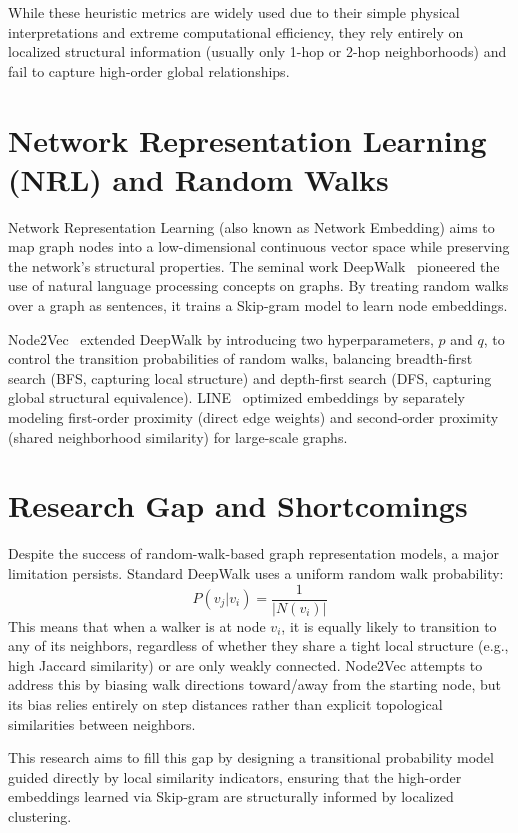 While these heuristic metrics are widely used due to their simple physical interpretations and extreme computational efficiency, they rely entirely on localized structural information (usually only 1-hop or 2-hop neighborhoods) and fail to capture high-order global relationships.

\section{Network Representation Learning (NRL) and Random Walks}

Network Representation Learning (also known as Network Embedding) aims to map graph nodes into a low-dimensional continuous vector space while preserving the network's structural properties. The seminal work DeepWalk~\citep{perozzi2014deepwalk} pioneered the use of natural language processing concepts on graphs. By treating random walks over a graph as sentences, it trains a Skip-gram model to learn node embeddings. 

Node2Vec~\citep{grover2016node2vec} extended DeepWalk by introducing two hyperparameters, $p$ and $q$, to control the transition probabilities of random walks, balancing breadth-first search (BFS, capturing local structure) and depth-first search (DFS, capturing global structural equivalence). LINE~\citep{tang2015line} optimized embeddings by separately modeling first-order proximity (direct edge weights) and second-order proximity (shared neighborhood similarity) for large-scale graphs.

\section{Research Gap and Shortcomings}

Despite the success of random-walk-based graph representation models, a major limitation persists. Standard DeepWalk uses a uniform random walk probability:
\begin{equation}
    P(v_j | v_i) = \frac{1}{|N(v_i)|}
\end{equation}
This means that when a walker is at node $v_i$, it is equally likely to transition to any of its neighbors, regardless of whether they share a tight local structure (e.g., high Jaccard similarity) or are only weakly connected. Node2Vec attempts to address this by biasing walk directions toward/away from the starting node, but its bias relies entirely on step distances rather than explicit topological similarities between neighbors. 

This research aims to fill this gap by designing a transitional probability model guided directly by local similarity indicators, ensuring that the high-order embeddings learned via Skip-gram are structurally informed by localized clustering.

